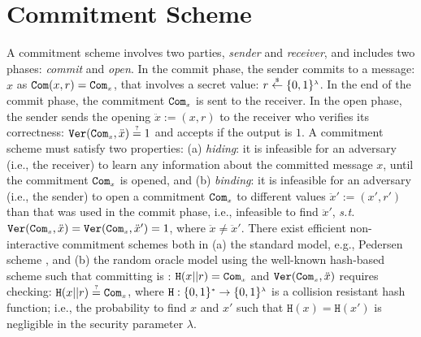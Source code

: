 




\section{Commitment Scheme}\label{subsec:commit-long}


 A commitment scheme involves two parties,  \emph{sender} and  \emph{receiver}, and includes  two phases: \emph{commit} and  \emph{open}. In the commit phase, the sender  commits to a message: $x$ as $\mathtt{Com}(x,r)=\mathtt{Com}_{\scriptscriptstyle x}$, that involves a secret value: $r\stackrel{\scriptscriptstyle\$}\leftarrow \{0,1\}^{\scriptscriptstyle\lambda}$. In the end of the commit phase,  the commitment $\mathtt{Com}_{\scriptscriptstyle x}$ is sent to the receiver. In the open phase, the sender sends the opening $\ddot{x}:=(x,r)$ to the receiver who verifies its correctness: $\mathtt{Ver}(\mathtt{Com}_{\scriptscriptstyle x},\ddot{x})\stackrel{\scriptscriptstyle ?}=1$ and accepts if the output is $1$.  A commitment scheme must satisfy two properties: (a) \textit{hiding}: it is infeasible for an adversary (i.e., the receiver) to learn any information about the committed  message $x$, until the commitment $\mathtt{Com}_{\scriptscriptstyle x}$ is opened, and (b) \textit{binding}: it is infeasible for an adversary (i.e., the sender) to open a commitment $\mathtt{Com}_{\scriptscriptstyle x}$ to different values $\ddot{x}':=(x',r')$ than that was  used in the commit phase, i.e., infeasible to find  $\ddot{x}'$, \textit{s.t.} $\mathtt{Ver}(\mathtt{Com}_{\scriptscriptstyle x},\ddot{x})=\mathtt{Ver}(\mathtt{Com}_{\scriptscriptstyle x},\ddot{x}')=1$, where $\ddot{x}\neq \ddot{x}'$.  There exist efficient non-interactive  commitment schemes both in (a) the standard model, e.g., Pedersen scheme \cite{Pedersen91}, and (b)  the random oracle model using the well-known hash-based scheme such that committing  is : $\mathtt{H}(x||r)=\mathtt{Com}_{\scriptscriptstyle x}$ and $\mathtt{Ver}(\mathtt{Com}_{\scriptscriptstyle x},\ddot{x})$ requires checking: $\mathtt{H}(x||r)\stackrel{\scriptscriptstyle ?}=\mathtt{Com}_{\scriptscriptstyle x}$, where $\mathtt{H}:\{0,1\}^{\scriptscriptstyle *}\rightarrow \{0,1\}^{\scriptscriptstyle\lambda}$ is a collision resistant hash function; i.e., the probability to find $x$ and $x'$ such that $\mathtt{H}(x)=\mathtt{H}(x')$ is negligible in the security parameter $\lambda$.
 